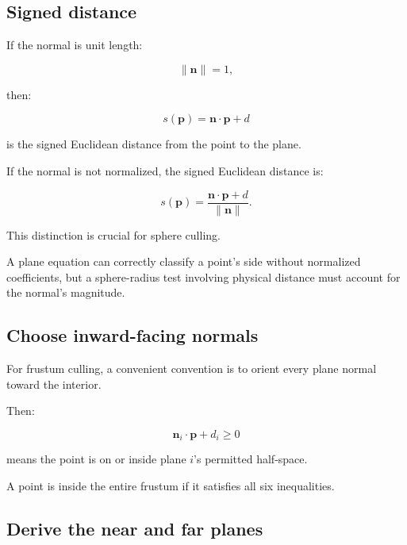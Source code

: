 \subsection{Signed distance}\label{02-foundations-ii-ch034-signed-distance}

\hypertarget{02-foundations-ii-ch034-signed-distance}{}

If the normal is unit length:

\[
 \|\mathbf n\|=1,
\]

then:

\[
 \boxed{ s(\mathbf p)=\mathbf n\cdot\mathbf p+d }
\]

is the signed Euclidean distance from the point to the plane.

If the normal is not normalized, the signed Euclidean distance is:

\[
 \boxed{ s(\mathbf p)= \frac{\mathbf n\cdot\mathbf p+d}{\|\mathbf n\|} }.
\]

This distinction is crucial for sphere culling.

A plane equation can correctly classify a point's side without normalized coefficients, but a sphere-radius test involving physical distance must account for the normal's magnitude.

\subsection{Choose inward-facing normals}\label{02-foundations-ii-ch034-choose-inward-facing-normals}

\hypertarget{02-foundations-ii-ch034-choose-inward-facing-normals}{}

For frustum culling, a convenient convention is to orient every plane normal toward the interior.

Then:

\[
 \boxed{ \mathbf n_i\cdot\mathbf p+d_i\ge0 }
\]

means the point is on or inside plane \(i\)'s permitted half-space.

A point is inside the entire frustum if it satisfies all six inequalities.

\subsection{Derive the near and far planes}\label{02-foundations-ii-ch034-derive-the-near-and-far-planes}

\hypertarget{02-foundations-ii-ch034-derive-the-near-and-far-planes}{}


